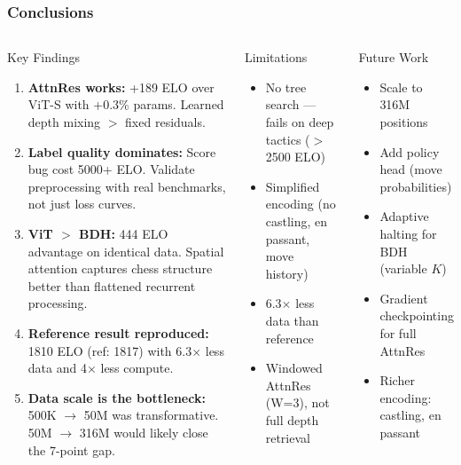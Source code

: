 \documentclass{beamer}
\begin{document}
\begin{frame}
\frametitle{Conclusions}

\begin{columns}

\begin{block}{Key Findings}
\footnotesize
\begin{enumerate}
  \item \textbf{AttnRes works:} +189 ELO over ViT-S with +0.3\% params. Learned depth mixing $>$ fixed residuals.
  \item \textbf{Label quality dominates:} Score bug cost 5000+ ELO. Validate preprocessing with real benchmarks, not just loss curves.
  \item \textbf{ViT $>$ BDH:} 444 ELO advantage on identical data. Spatial attention captures chess structure better than flattened recurrent processing.
  \item \textbf{Reference result reproduced:} \alert{1810 ELO} (ref: 1817) with 6.3$\times$ less data and 4$\times$ less compute.
  \item \textbf{Data scale is the bottleneck:} 500K $\to$ 50M was transformative. 50M $\to$ 316M would likely close the 7-point gap.
\end{enumerate}
\end{block}


\begin{block}{Limitations}
\footnotesize
\begin{itemize}
  \item No tree search --- fails on deep tactics ($>$2500 ELO)
  \item Simplified encoding (no castling, en passant, move history)
  \item 6.3$\times$ less data than reference
  \item Windowed AttnRes (W=3), not full depth retrieval
\end{itemize}
\end{block}

\begin{block}{Future Work}
\footnotesize
\begin{itemize}
  \item Scale to 316M positions
  \item Add policy head (move probabilities)
  \item Adaptive halting for BDH (variable $K$)
  \item Gradient checkpointing for full AttnRes
  \item Richer encoding: castling, en passant
\end{itemize}
\end{block}

\end{columns}

\end{frame}
\end{document}
